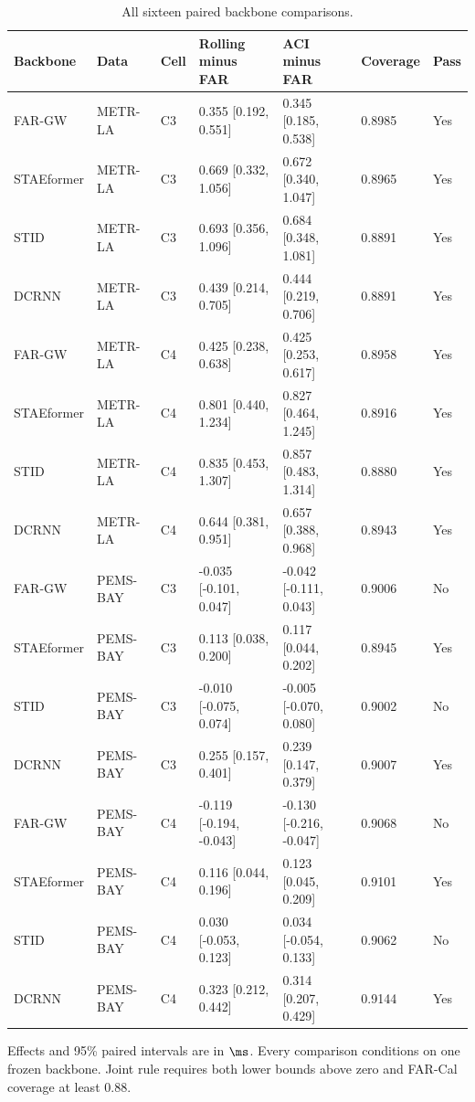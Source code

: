 \begin{table}[p]
\caption{All sixteen paired backbone comparisons.}\label{tab:backbones}
\centering\footnotesize
\setlength{\tabcolsep}{4pt}
\begin{tabular}{lllllll}\toprule
Backbone & Data & Cell & Rolling minus FAR & ACI minus FAR & Coverage & Pass \\\midrule
FAR-GW & METR-LA & C3 & 0.355 [0.192, 0.551] & 0.345 [0.185, 0.538] & 0.8985 & Yes \\
STAEformer & METR-LA & C3 & 0.669 [0.332, 1.056] & 0.672 [0.340, 1.047] & 0.8965 & Yes \\
STID & METR-LA & C3 & 0.693 [0.356, 1.096] & 0.684 [0.348, 1.081] & 0.8891 & Yes \\
DCRNN & METR-LA & C3 & 0.439 [0.214, 0.705] & 0.444 [0.219, 0.706] & 0.8891 & Yes \\
FAR-GW & METR-LA & C4 & 0.425 [0.238, 0.638] & 0.425 [0.253, 0.617] & 0.8958 & Yes \\
STAEformer & METR-LA & C4 & 0.801 [0.440, 1.234] & 0.827 [0.464, 1.245] & 0.8916 & Yes \\
STID & METR-LA & C4 & 0.835 [0.453, 1.307] & 0.857 [0.483, 1.314] & 0.8880 & Yes \\
DCRNN & METR-LA & C4 & 0.644 [0.381, 0.951] & 0.657 [0.388, 0.968] & 0.8943 & Yes \\
FAR-GW & PEMS-BAY & C3 & -0.035 [-0.101, 0.047] & -0.042 [-0.111, 0.043] & 0.9006 & No \\
STAEformer & PEMS-BAY & C3 & 0.113 [0.038, 0.200] & 0.117 [0.044, 0.202] & 0.8945 & Yes \\
STID & PEMS-BAY & C3 & -0.010 [-0.075, 0.074] & -0.005 [-0.070, 0.080] & 0.9002 & No \\
DCRNN & PEMS-BAY & C3 & 0.255 [0.157, 0.401] & 0.239 [0.147, 0.379] & 0.9007 & Yes \\
FAR-GW & PEMS-BAY & C4 & -0.119 [-0.194, -0.043] & -0.130 [-0.216, -0.047] & 0.9068 & No \\
STAEformer & PEMS-BAY & C4 & 0.116 [0.044, 0.196] & 0.123 [0.045, 0.209] & 0.9101 & Yes \\
STID & PEMS-BAY & C4 & 0.030 [-0.053, 0.123] & 0.034 [-0.054, 0.133] & 0.9062 & No \\
DCRNN & PEMS-BAY & C4 & 0.323 [0.212, 0.442] & 0.314 [0.207, 0.429] & 0.9144 & Yes \\
\bottomrule\end{tabular}
\par\smallskip\footnotesize Effects and 95\% paired intervals are in $\ms$. Every comparison conditions on one frozen backbone. Joint rule requires both lower bounds above zero and FAR-Cal coverage at least 0.88.
\end{table}\clearpage
